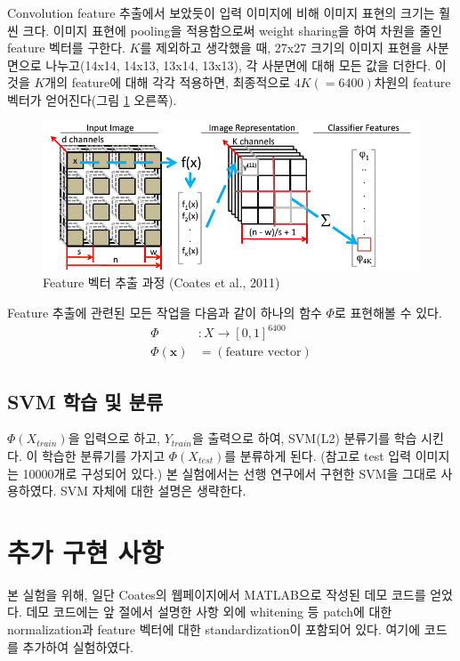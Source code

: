 \documentclass[a4paper,9pt]{article}
\begin{document}
\begin{multicols*}{2}
Convolution feature 추출에서 보았듯이 입력 이미지에 비해 이미지 표현의 크기는 훨씬 크다.
이미지 표현에 pooling을 적용함으로써 weight sharing을 하여 차원을 줄인 feature 벡터를 구한다.
$K$를 제외하고 생각했을 때, 27x27 크기의 이미지 표현을 사분면으로 나누고(14x14, 14x13, 13x14, 13x13), 각 사분면에 대해 모든 값을 더한다.
이것을 $K$개의 feature에 대해 각각 적용하면, 최종적으로 $4K(=6400)$차원의 feature 벡터가 얻어진다(그림 \ref{fig:feature_extraction} 오른쪽).

\begin{figure}[H]
\includegraphics[width=\linewidth]{feature_extraction}
\caption{Feature 벡터 추출 과정 (Coates et al., 2011)}
\label{fig:feature_extraction}
\end{figure}

Feature 추출에 관련된 모든 작업을 다음과 같이 하나의 함수 $\Phi$로 표현해볼 수 있다.
\begin{align*}
    \Phi &\colon X \to [0, 1]^{6400} \\
    \Phi(\mathbf{x}) &= (\text{feature vector})
\end{align*}

\subsection{SVM 학습 및 분류}

$\Phi(X_{train})$을 입력으로 하고, $Y_{train}$을 출력으로 하여, SVM(L2) 분류기를 학습 시킨다.
이 학습한 분류기를 가지고 $\Phi(X_{test})$를 분류하게 된다.
(참고로 test 입력 이미지는 10000개로 구성되어 있다.)
본 실험에서는 선행 연구에서 구현한 SVM을 그대로 사용하였다.
SVM 자체에 대한 설명은 생략한다.

\section{추가 구현 사항}

본 실험을 위해, 일단 Coates의 웹페이지에서 MATLAB으로 작성된 데모 코드를 얻었다.
데모 코드에는 앞 절에서 설명한 사항 외에 whitening 등 patch에 대한 normalization과 feature 벡터에 대한 standardization이 포함되어 있다.
여기에 코드를 추가하여 실험하였다.


\end{multicols*}
\end{document}
